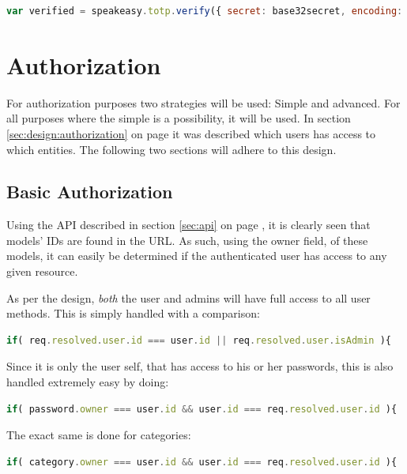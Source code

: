 			\begin{lstlisting}[gobble=16,language=JavaScript,caption={Verifying a TOTP token using Speakeasy},label={lst:example:speakeasy:verification}]
                var verified = speakeasy.totp.verify({ secret: base32secret, encoding: 'base32', token: userToken });
			\end{lstlisting}

	\section{Authorization}
		\label{sec:impl:authorization}
		For authorization purposes two strategies will be used: Simple and advanced. For all purposes where the simple is a possibility, it will be used. In section \ref{sec:design:authorization} on page \pageref{sec:design:authorization} it was described which users has access to which entities. The following two sections will adhere to this design.

		\subsection{Basic Authorization}
			Using the API described in section \ref{sec:api} on page \pageref{sec:api}, it is clearly seen that models' IDs are found in the URL. As such, using the owner field, of these models, it can easily be determined if the authenticated user has access to any given resource.

			As per the design, \emph{both} the user and admins will have full access to all user methods. This is simply handled with a comparison:
			\begin{lstlisting}[gobble=16,language=JavaScript]
                if( req.resolved.user.id === user.id || req.resolved.user.isAdmin ){
			\end{lstlisting}

			Since it is only the user self, that has access to his or her passwords, this is also handled extremely easy by doing:
			\begin{lstlisting}[gobble=16,language=JavaScript]
                if( password.owner === user.id && user.id === req.resolved.user.id ){
			\end{lstlisting}
			The exact same is done for categories:
			\begin{lstlisting}[gobble=16,language=JavaScript]
                if( category.owner === user.id && user.id === req.resolved.user.id ){
			\end{lstlisting}

